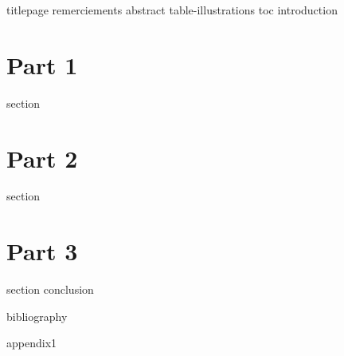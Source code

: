 \documentclass[12pt]{article}
\begin{document}
    {titlepage}
    {remerciements}
    {abstract}
    {table-illustrations}
    {toc}
    {introduction}


    \clearpage{}
    \part{Part 1}

    {section}

    \clearpage{}
    \part{Part 2}

    {section}

    \clearpage{}
    \part{Part 3}

    {section}
    {conclusion}


    {bibliography}

    \clearpage{}
    \printglossaries

    \appendixwithtoc
    {appendix1}
\end{document}
